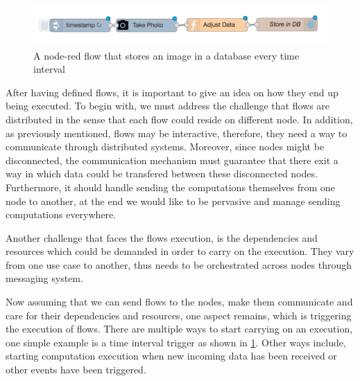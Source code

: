 \begin{figure}[H]
	\centering
	\includegraphics[scale=0.5]{images/db-out.png} 
	\caption{A node-red flow that stores an image in a database every time interval}
	\label{fig:flow}
\end{figure}

After having defined flows, it is important to give an idea on how they end up being executed. To begin with, we must address the challenge that flows are distributed in the sense that each flow could reside on different node. In addition, as previously mentioned, flows may be interactive, therefore, they need a way to communicate through distributed systems. Moreover, since nodes might be disconnected,  the communication mechanism must guarantee that there  exit  a way  in which data could be transfered between these disconnected nodes. Furthermore, it  should handle sending the computations themselves from one node to another, at the end we would like to be pervasive and manage sending computations everywhere.

 Another challenge that faces the flows execution, is the dependencies and resources which could be demanded in order to carry on the execution. They vary from one use case to another, thus needs to be orchestrated across nodes through messaging system.

Now assuming that we can send flows to the nodes, make them communicate and care for their dependencies and resources, one aspect remains, which is triggering the execution of flows. There are multiple ways to start carrying on an execution, one simple example is a time interval trigger as shown in \ref{fig:flow}. Other ways include, starting computation execution when new incoming data has been received or other events have been triggered.\\




